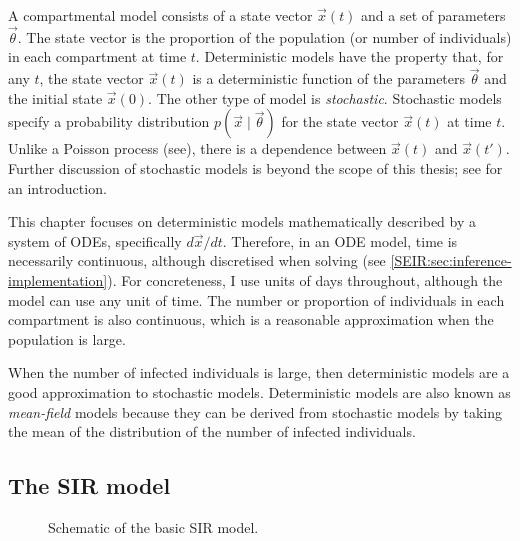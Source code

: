\documentclass[thesis.tex]{subfiles}
\begin{document}
A compartmental model consists of a state vector $\vec{x}(t)$ and a set of parameters $\vec{\theta}$.
The state vector is the proportion of the population (or number of individuals) in each compartment at time $t$.
Deterministic models have the property that, for any $t$, the state vector $\vec{x}(t)$ is a deterministic function of the parameters $\vec{\theta}$ and the initial state $\vec{x}(0)$.
The other type of model is \emph{stochastic}.
Stochastic models specify a probability distribution $p(\vec{x} \mid \vec{\theta})$ for the state vector $\vec{x}(t)$ at time $t$.
Unlike a Poisson process (see), there is a dependence between $\vec{x}(t)$ and $\vec{x}(t')$.
Further discussion of stochastic models is beyond the scope of this thesis; see \textcite[chapter 6]{keelingModeling} for an introduction.

This chapter focuses on deterministic models mathematically described by a system of ODEs, specifically $d\vec{x}/dt$.
Therefore, in an ODE model, time is necessarily continuous, although discretised when solving (see \cref{SEIR:sec:inference-implementation}).
For concreteness, I use units of days throughout, although the model can use any unit of time.
The number or proportion of individuals in each compartment is also continuous, which is a reasonable approximation when the population is large.

When the number of infected individuals is large, then deterministic models are a good approximation to stochastic models.
Deterministic models are also known as \emph{mean-field} models because they can be derived from stochastic models by taking the mean of the distribution of the number of infected individuals.



\subsection{The SIR model} \label{SEIR:sec:SIR}

\begin{figure}[h]
\centering
{}
  \caption[The SIR model]{Schematic of the basic SIR model.}
  \label{SEIR:fig:SIR}
\end{figure}
\end{document}

